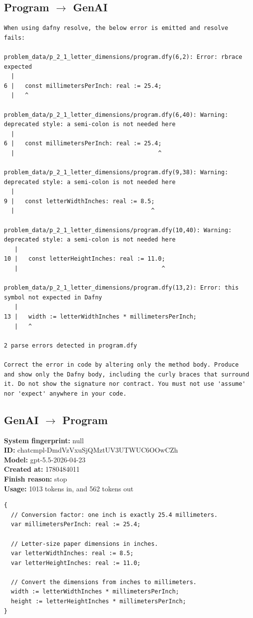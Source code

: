 \documentclass{article}
\begin{document}
\subsection*{Program $\rightarrow$ GenAI}
\begin{lstlisting}
When using dafny resolve, the below error is emitted and resolve fails:

problem_data/p_2_1_letter_dimensions/program.dfy(6,2): Error: rbrace expected
  |
6 |   const millimetersPerInch: real := 25.4;
  |   ^

problem_data/p_2_1_letter_dimensions/program.dfy(6,40): Warning: deprecated style: a semi-colon is not needed here
  |
6 |   const millimetersPerInch: real := 25.4;
  |                                         ^

problem_data/p_2_1_letter_dimensions/program.dfy(9,38): Warning: deprecated style: a semi-colon is not needed here
  |
9 |   const letterWidthInches: real := 8.5;
  |                                       ^

problem_data/p_2_1_letter_dimensions/program.dfy(10,40): Warning: deprecated style: a semi-colon is not needed here
   |
10 |   const letterHeightInches: real := 11.0;
   |                                         ^

problem_data/p_2_1_letter_dimensions/program.dfy(13,2): Error: this symbol not expected in Dafny
   |
13 |   width := letterWidthInches * millimetersPerInch;
   |   ^

2 parse errors detected in program.dfy

Correct the error in code by altering only the method body. Produce and show only the Dafny body, including the curly braces that surround it. Do not show the signature nor contract. You must not use 'assume' nor 'expect' anywhere in your code.
\end{lstlisting}
\subsection*{GenAI $\rightarrow$ Program}
\textbf{System fingerprint: }null
\\\textbf{ID: }chatcmpl-DmdVzVxuSjQMztUV3UTWUC6OOwCZh
\\\textbf{Model: }gpt-5.5-2026-04-23
\\\textbf{Created at: }1780484011
\\\textbf{Finish reason: }stop
\\\textbf{Usage: }1013 tokens in, and 562 tokens out
\begin{lstlisting}
{
  // Conversion factor: one inch is exactly 25.4 millimeters.
  var millimetersPerInch: real := 25.4;

  // Letter-size paper dimensions in inches.
  var letterWidthInches: real := 8.5;
  var letterHeightInches: real := 11.0;

  // Convert the dimensions from inches to millimeters.
  width := letterWidthInches * millimetersPerInch;
  height := letterHeightInches * millimetersPerInch;
}
\end{lstlisting}
\end{document}
